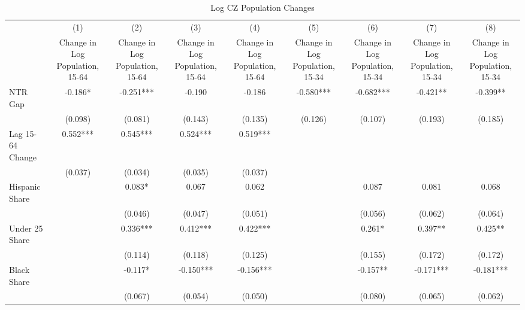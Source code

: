 \begin{table}[htbp]\centering
\def\sym#1{\ifmmode^{#1}\else\(^{#1}\)\fi}
\caption{Log CZ Population Changes}
\begin{tabular}{l*{8}{c}}
\toprule
                    &\multicolumn{1}{c}{(1)}&\multicolumn{1}{c}{(2)}&\multicolumn{1}{c}{(3)}&\multicolumn{1}{c}{(4)}&\multicolumn{1}{c}{(5)}&\multicolumn{1}{c}{(6)}&\multicolumn{1}{c}{(7)}&\multicolumn{1}{c}{(8)}\\
                    &\multicolumn{1}{c}{Change in Log Population, 15-64}&\multicolumn{1}{c}{Change in Log Population, 15-64}&\multicolumn{1}{c}{Change in Log Population, 15-64}&\multicolumn{1}{c}{Change in Log Population, 15-64}&\multicolumn{1}{c}{Change in Log Population, 15-34}&\multicolumn{1}{c}{Change in Log Population, 15-34}&\multicolumn{1}{c}{Change in Log Population, 15-34}&\multicolumn{1}{c}{Change in Log Population, 15-34}\\
\midrule
NTR Gap             &   -0.186*  &   -0.251***&   -0.190   &   -0.186   &   -0.580***&   -0.682***&   -0.421** &   -0.399** \\
                    &  (0.098)   &  (0.081)   &  (0.143)   &  (0.135)   &  (0.126)   &  (0.107)   &  (0.193)   &  (0.185)   \\
\addlinespace
Lag 15-64 Change    &    0.552***&    0.545***&    0.524***&    0.519***&            &            &            &            \\
                    &  (0.037)   &  (0.034)   &  (0.035)   &  (0.037)   &            &            &            &            \\
\addlinespace
Hispanic Share      &            &    0.083*  &    0.067   &    0.062   &            &    0.087   &    0.081   &    0.068   \\
                    &            &  (0.046)   &  (0.047)   &  (0.051)   &            &  (0.056)   &  (0.062)   &  (0.064)   \\
\addlinespace
Under 25 Share      &            &    0.336***&    0.412***&    0.422***&            &    0.261*  &    0.397** &    0.425** \\
                    &            &  (0.114)   &  (0.118)   &  (0.125)   &            &  (0.155)   &  (0.172)   &  (0.172)   \\
\addlinespace
Black Share         &            &   -0.117*  &   -0.150***&   -0.156***&            &   -0.157** &   -0.171***&   -0.181***\\
                    &            &  (0.067)   &  (0.054)   &  (0.050)   &            &  (0.080)   &  (0.065)   &  (0.062)   \\

\end{tabular}
\end{table}
